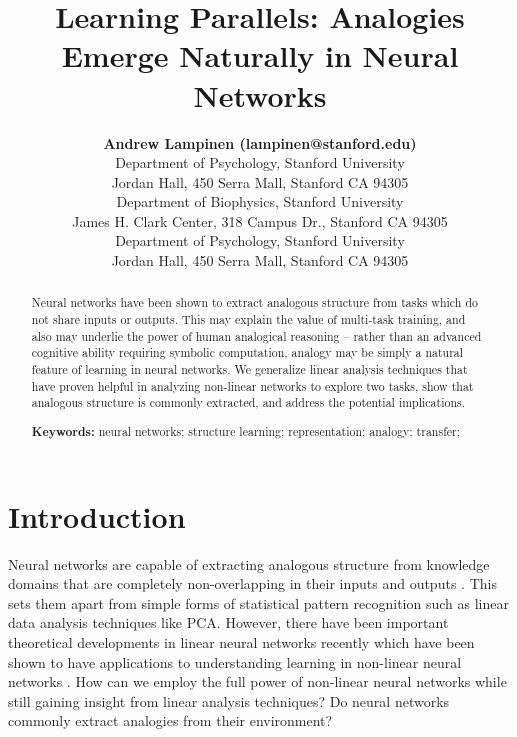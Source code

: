 \documentclass[10pt,letterpaper]{article}
\title{Learning Parallels: Analogies Emerge Naturally in Neural Networks}
\author{{\large \bf Andrew Lampinen (lampinen@stanford.edu)} \\
  Department of Psychology, Stanford University \\
  Jordan Hall, 450 Serra Mall, Stanford CA 94305 
  \AND {\large \bf Shaw Hsu (cshawhsu@stanford.edu)} \\
  Department of Biophysics, Stanford University \\
  James H. Clark Center, 318 Campus Dr., Stanford CA 94305
  \AND {\large \bf James L. McClelland (mcclelland@stanford.edu)} \\
  Department of Psychology, Stanford University \\
  Jordan Hall, 450 Serra Mall, Stanford CA 94305}
\begin{document}
\maketitle


\begin{abstract}
Neural networks have been shown to extract analogous structure from tasks which do not share inputs or outputs. This may explain the value of multi-task training, and also may underlie the power of human analogical reasoning -- rather than an advanced cognitive ability requiring symbolic computation, analogy may be simply a natural feature of learning in neural networks. We generalize linear analysis techniques that have proven helpful in analyzing non-linear networks to explore two tasks, show that analogous structure is commonly extracted, and address the potential implications. 

\textbf{Keywords:} 
neural networks; structure learning; representation; analogy; transfer; 
\end{abstract}


\section{Introduction}
Neural networks are capable of extracting analogous structure from knowledge domains that are completely non-overlapping in their inputs and outputs \citep{Hinton1986,Rogers2008}. This sets them apart from simple forms of statistical pattern recognition \citep{Rogers2008} such as linear data analysis techniques like PCA. However, there have been important theoretical developments in linear neural networks recently which have been shown to have applications to understanding learning in non-linear neural networks \citep{Saxe2013}. How can we employ the full power of non-linear neural networks while still gaining insight from linear analysis techniques? Do neural networks commonly extract analogies from their environment?\par 
\end{document}
